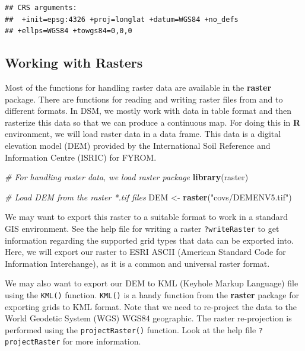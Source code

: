 \documentclass[10pt,b5paper,]{book}
\newenvironment{Shaded}{\begin{snugshade}}{\end{snugshade}}
\newcommand{\CommentTok}[1]{\textcolor[rgb]{0.56,0.35,0.01}{\textit{#1}}}
\newcommand{\KeywordTok}[1]{\textcolor[rgb]{0.13,0.29,0.53}{\textbf{#1}}}
\newcommand{\NormalTok}[1]{#1}
\newcommand{\StringTok}[1]{\textcolor[rgb]{0.31,0.60,0.02}{#1}}
\theoremstyle{definition}
\theoremstyle{definition}
\theoremstyle{definition}
\theoremstyle{remark}
\begin{document}
\begin{verbatim}
## CRS arguments:
##  +init=epsg:4326 +proj=longlat +datum=WGS84 +no_defs
## +ellps=WGS84 +towgs84=0,0,0
\end{verbatim}

\hypertarget{working-with-rasters}{%
\subsection{Working with Rasters}\label{working-with-rasters}}

Most of the functions for handling raster data are available in the
\textbf{raster} package. There are functions for reading and writing
raster files from and to different formats. In DSM, we mostly work with
data in table format and then rasterize this data so that we can produce
a continuous map. For doing this in \textbf{R} environment, we will load
raster data in a data frame. This data is a digital elevation model
(DEM) provided by the International Soil Reference and Information
Centre (ISRIC) for FYROM.

\begin{Shaded}
\begin{Highlighting}[]
\CommentTok{# For handling raster data, we load raster package}
\KeywordTok{library}\NormalTok{(raster)}

\CommentTok{# Load DEM from the raster *.tif files}
\NormalTok{DEM <-}\StringTok{ }\KeywordTok{raster}\NormalTok{(}\StringTok{"covs/DEMENV5.tif"}\NormalTok{)}
\end{Highlighting}
\end{Shaded}

We may want to export this raster to a suitable format to work in a
standard GIS environment. See the help file for writing a raster
\texttt{?writeRaster} to get information regarding the supported grid
types that data can be exported into. Here, we will export our raster to
ESRI ASCII (American Standard Code for Information Interchange), as it
is a common and universal raster format.

We may also want to export our DEM to KML (Keyhole Markup Language) file
using the \texttt{KML()} function. \texttt{KML()} is a handy function
from the \textbf{raster} package for exporting grids to KML format. Note
that we need to re-project the data to the World Geodetic System (WGS)
WGS84 geographic. The raster re-projection is performed using the
\texttt{projectRaster()} function. Look at the help file
\texttt{?projectRaster} for more information.
\end{document}
